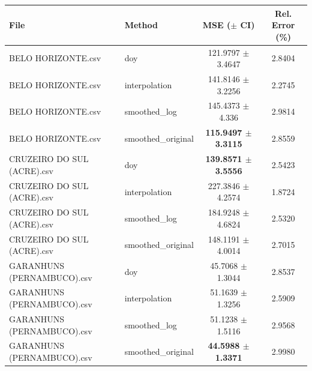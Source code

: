 \begin{tabular}{llcc}
\toprule
File & Method & MSE ($\pm$ CI) & Rel. Error (\%) \\
\midrule
BELO HORIZONTE.csv & doy & 121.9797 $\pm$ 3.4647 & 2.8404 \\
BELO HORIZONTE.csv & interpolation & 141.8146 $\pm$ 3.2256 & 2.2745 \\
BELO HORIZONTE.csv & smoothed_log & 145.4373 $\pm$ 4.336 & 2.9814 \\
BELO HORIZONTE.csv & smoothed_original & \textbf{115.9497 $\pm$ 3.3115} & 2.8559 \\
CRUZEIRO DO SUL (ACRE).csv & doy & \textbf{139.8571 $\pm$ 3.5556} & 2.5423 \\
CRUZEIRO DO SUL (ACRE).csv & interpolation & 227.3846 $\pm$ 4.2574 & 1.8724 \\
CRUZEIRO DO SUL (ACRE).csv & smoothed_log & 184.9248 $\pm$ 4.6824 & 2.5320 \\
CRUZEIRO DO SUL (ACRE).csv & smoothed_original & 148.1191 $\pm$ 4.0014 & 2.7015 \\
GARANHUNS (PERNAMBUCO).csv & doy & 45.7068 $\pm$ 1.3044 & 2.8537 \\
GARANHUNS (PERNAMBUCO).csv & interpolation & 51.1639 $\pm$ 1.3256 & 2.5909 \\
GARANHUNS (PERNAMBUCO).csv & smoothed_log & 51.1238 $\pm$ 1.5116 & 2.9568 \\
GARANHUNS (PERNAMBUCO).csv & smoothed_original & \textbf{44.5988 $\pm$ 1.3371} & 2.9980 \\
\bottomrule
\end{tabular}
